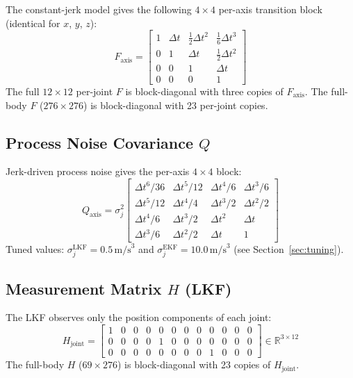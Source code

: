 \documentclass[11pt, a4paper]{article}
\begin{document}
The constant-jerk model gives the following $4\times4$ per-axis transition block
(identical for $x$, $y$, $z$):
\begin{equation}
  F_\text{axis} =
  \begin{bmatrix}
    1 & \Delta t & \tfrac{1}{2}\Delta t^2 & \tfrac{1}{6}\Delta t^3 \\
    0 & 1        & \Delta t               & \tfrac{1}{2}\Delta t^2 \\
    0 & 0        & 1                      & \Delta t               \\
    0 & 0        & 0                      & 1
  \end{bmatrix}
\end{equation}
The full $12\times12$ per-joint $F$ is block-diagonal with three copies of $F_\text{axis}$.
The full-body $F$ ($276\times276$) is block-diagonal with 23 per-joint copies.

\subsection{Process Noise Covariance \texorpdfstring{$Q$}{Q}}

Jerk-driven process noise gives the per-axis $4\times4$ block:
\begin{equation}
  Q_\text{axis} = \sigma_j^2
  \begin{bmatrix}
    \Delta t^6/36 & \Delta t^5/12 & \Delta t^4/6 & \Delta t^3/6 \\
    \Delta t^5/12 & \Delta t^4/4  & \Delta t^3/2 & \Delta t^2/2 \\
    \Delta t^4/6  & \Delta t^3/2  & \Delta t^2   & \Delta t     \\
    \Delta t^3/6  & \Delta t^2/2  & \Delta t     & 1
  \end{bmatrix}
\end{equation}
Tuned values: $\sigma_j^\text{LKF} = 0.5\,\text{m/s}^3$ and
$\sigma_j^\text{EKF} = 10.0\,\text{m/s}^3$ (see Section~\ref{sec:tuning}).

\subsection{Measurement Matrix \texorpdfstring{$H$}{H} (LKF)}

The LKF observes only the position components of each joint:
\begin{equation}
  H_\text{joint} =
  \begin{bmatrix}
    1 & 0 & 0 & 0 & 0 & 0 & 0 & 0 & 0 & 0 & 0 & 0 \\
    0 & 0 & 0 & 0 & 1 & 0 & 0 & 0 & 0 & 0 & 0 & 0 \\
    0 & 0 & 0 & 0 & 0 & 0 & 0 & 0 & 1 & 0 & 0 & 0
  \end{bmatrix}
  \in \mathbb{R}^{3\times12}
\end{equation}
The full-body $H$ ($69\times276$) is block-diagonal with 23 copies of $H_\text{joint}$.
\end{document}
